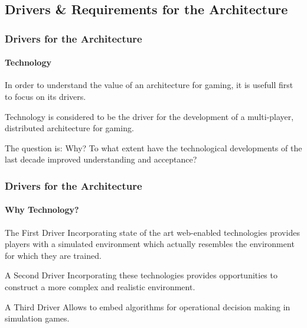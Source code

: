 
\subsection{Drivers \& Requirements for the Architecture}

\begin{frame}
\frametitle{Drivers for the Architecture}
\framesubtitle{Technology}
In order to understand the value of an architecture for gaming,
it is usefull first to focus on its drivers.
\pause
\begin{block}{}
Technology is considered to be the driver for
the development of a multi-player, distributed architecture
for gaming.
\end{block}
\pause
\vfill
\begin{block}{The question is:}
Why? To what extent have
the technological developments of the last decade improved
understanding and acceptance?
\end{block}
\end{frame}

\begin{frame}
\frametitle{Drivers for the Architecture}
\framesubtitle{Why Technology?}
\begin{block}{The First Driver}
Incorporating state of the art web-enabled technologies
provides players with a simulated environment
which actually resembles the environment for which they are trained.
\end{block}
\pause
\begin{block}{A Second Driver}
Incorporating these technologies provides opportunities to construct a
more complex and realistic environment.
\end{block}
\pause
\begin{block}{A Third Driver}
Allows to embed algorithms for operational
decision making in simulation games.
\end{block}
\end{frame}


